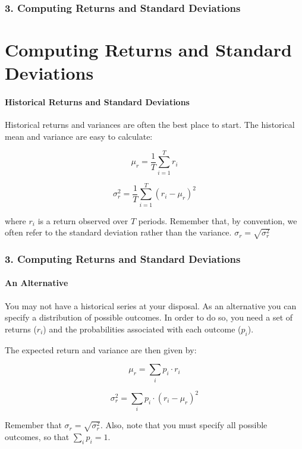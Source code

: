 \documentclass{beamer}
\begin{document}
\begin{frame}[t]
    \frametitle{3. Computing Returns and Standard Deviations}
    \section{Computing Returns and Standard Deviations}
    \framesubtitle{Historical Returns and Standard Deviations}

    Historical returns and variances are often the best place to start.  The historical mean and variance are easy to calculate:

    $$\mu_r = \frac{1}{T} \sum_{i=1}^T r_i$$ 
    
    $$\sigma^2_r = \frac{1}{T} \sum_{i=1}^T (r_i - \mu_r)^2$$
    
    where $r_i$ is a return observed over $T$ periods.  Remember that, by convention, we often refer to the standard deviation rather than the variance.   $\sigma_r = \sqrt{\sigma^2_r}$


\end{frame}

\begin{frame}[t]
    \frametitle{3. Computing Returns and Standard Deviations}
    \framesubtitle{An Alternative}

    You may not have a historical series at your disposal.  As an alternative you can specify a distribution of possible outcomes.  In order to do so, you need a set of returns ($r_i$) and the probabilities associated with each outcome ($p_i$).   
    \vspace{1em}

    The expected return and variance are then given by:
    
    $$\mu_r = \sum_i p_i \cdot r_i$$
    
    $$\sigma^2_r = \sum_i p_i \cdot (r_i - \mu_r)^2$$

    Remember that $\sigma_r = \sqrt{\sigma^2_r}$.  Also, note that you must specify all possible outcomes, so that $\sum_{i}p_i = 1$.


\end{frame}
\end{document}
